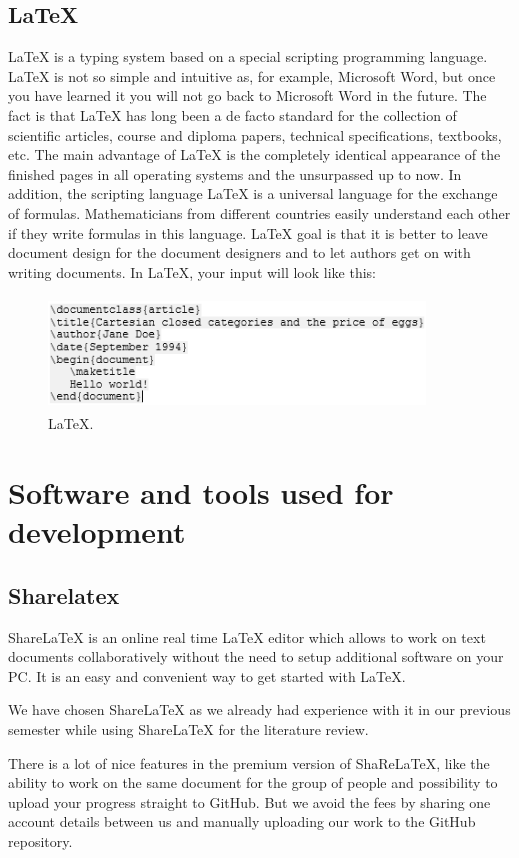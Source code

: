 \subsection{LaTeX}
LaTeX is a typing system based on a special scripting programming language. LaTeX is not so simple and intuitive as, for example, Microsoft Word, but once you have learned it you will not go back to Microsoft Word in the future. The fact is that LaTeX has long been a de facto standard for the collection of scientific articles, course and diploma papers, technical specifications, textbooks, etc. The main advantage of LaTeX is the completely identical appearance of the finished pages in all operating systems and the unsurpassed up to now. In addition, the scripting language LaTeX is a universal language for the exchange of formulas. Mathematicians from different countries easily understand each other if they write formulas in this language.
LaTeX goal is that it is better to leave document design for the document designers and to let authors get on with writing documents. In LaTeX, your  input will look like this: \cite{LaTeX}

\begin{figure}[h]
\centering
\includegraphics[width=10cm, height=3cm]{img/Letex.PNG}
\caption{LaTeX.}
\end{figure}

\section{Software and tools used for development}

\subsection{Sharelatex}
ShareLaTeX is an online real time LaTeX editor which allows to work on text documents collaboratively without the need to setup additional software on your PC. It is an easy and convenient way to get started with LaTeX. \cite{Sharelatex}\par
We have chosen ShareLaTeX as we already had experience with it in our previous semester while using ShareLaTeX for the literature review.\par
There is a lot of nice features in the premium version of ShaReLaTeX, like the ability to work on the same document for the group of people and possibility to upload your progress straight to GitHub. But we avoid the fees by sharing one account details between us and manually uploading our work to the GitHub repository.

